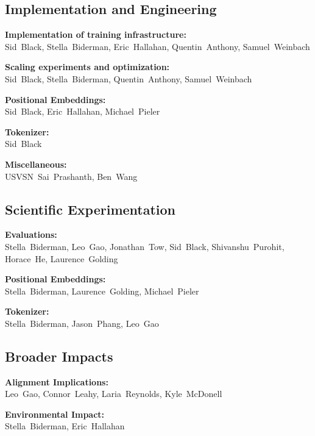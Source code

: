 \documentclass[11pt]{article}
\begin{document}
\subsection*{Implementation and Engineering}
\begin{adjustwidth}{\parindent}{}
\setlength{\parindent}{0pt}
\textbf{Implementation of training infrastructure:}\\\mbox{Sid Black}, \mbox{Stella Biderman}, \mbox{Eric Hallahan}, \mbox{Quentin Anthony}, \mbox{Samuel Weinbach} \setlength{\parskip}{0.5em}\par
\textbf{Scaling experiments and optimization:}\\\mbox{Sid Black}, \mbox{Stella Biderman}, \mbox{Quentin Anthony}, \mbox{Samuel Weinbach} \par
\textbf{Positional Embeddings:}\\\mbox{Sid~Black}, \mbox{Eric Hallahan}, \mbox{Michael~Pieler} \par
\textbf{Tokenizer:}\\Sid~Black \par
\textbf{Miscellaneous:}\\\mbox{USVSN~Sai~Prashanth}, \mbox{Ben~Wang} \par
\end{adjustwidth}

\subsection*{Scientific Experimentation}
\begin{adjustwidth}{\parindent}{}
\setlength{\parindent}{0pt}
\textbf{Evaluations:}\\\mbox{Stella~Biderman}, \mbox{Leo~Gao}, \mbox{Jonathan~Tow}, \mbox{Sid~Black}, \mbox{Shivanshu~Purohit}, \mbox{Horace~He}, \mbox{Laurence~Golding} \setlength{\parskip}{0.5em}\par
\textbf{Positional Embeddings:}\\\mbox{Stella~Biderman}, \mbox{Laurence~Golding}, \mbox{Michael~Pieler} \par
\textbf{Tokenizer:}\\\mbox{Stella~Biderman}, \mbox{Jason~Phang}, \mbox{Leo~Gao} \par
\end{adjustwidth}

\subsection*{Broader Impacts}
\begin{adjustwidth}{\parindent}{}
\setlength{\parindent}{0pt}
\textbf{Alignment Implications:}\\\mbox{Leo~Gao}, \mbox{Connor~Leahy}, \mbox{Laria~Reynolds}, \mbox{Kyle~McDonell} \setlength{\parskip}{0.5em}\par
\textbf{Environmental Impact:}\\\mbox{Stella~Biderman}, \mbox{Eric~Hallahan} \par
\end{adjustwidth}
\end{document}
